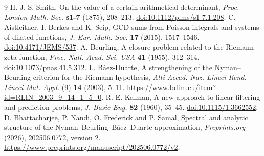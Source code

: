 \documentclass[11pt]{amsart}
\theoremstyle{definition}
\begin{document}
\begin{thebibliography}{9}
 H. J. S. Smith, On the value of a certain arithmetical
determinant, \emph{Proc. London Math. Soc.} \textbf{s1-7} (1875), 208--213.
\href{https://doi.org/10.1112/plms/s1-7.1.208}{doi:10.1112/plms/s1-7.1.208}.
 C. Aistleitner, I. Berkes and K. Seip, GCD sums from
Poisson integrals and systems of dilated functions,
\emph{J. Eur. Math. Soc.} \textbf{17} (2015), 1517--1546.
\href{https://doi.org/10.4171/JEMS/537}{doi:10.4171/JEMS/537}.
 A. Beurling, A closure problem related to the Riemann
zeta-function, \emph{Proc. Natl. Acad. Sci. USA} \textbf{41} (1955), 312--314.
\href{https://doi.org/10.1073/pnas.41.5.312}{doi:10.1073/pnas.41.5.312}.
 L. B\'aez-Duarte, A strengthening of the Nyman--Beurling
criterion for the Riemann hypothesis, \emph{Atti Accad. Naz. Lincei Rend.
Lincei Mat. Appl.} (9) \textbf{14} (2003), 5--11.
\url{https://www.bdim.eu/item?id=RLIN_2003_9_14_1_5_0}.
 R. E. Kalman, A new approach to linear filtering and
prediction problems, \emph{J. Basic Eng.} \textbf{82} (1960), 35--45.
\href{https://doi.org/10.1115/1.3662552}{doi:10.1115/1.3662552}.
 D. Bhattacharjee, P. Nandi, O. Frederick and
P. Samal, Spectral and analytic structure of the Nyman--Beurling--B\'aez--Duarte
approximation, \emph{Preprints.org} (2026), 202506.0772, version 2.
\url{https://www.preprints.org/manuscript/202506.0772/v2}.
\end{thebibliography}
\end{document}
